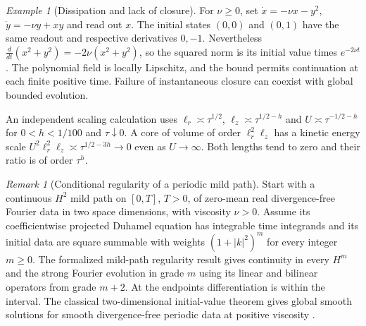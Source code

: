 \documentclass[aps,pra,onecolumn,superscriptaddress,nofootinbib,10pt]{revtex4-2}
\theoremstyle{definition}
\theoremstyle{remark}
\newtheorem{remark}[theorem]{Remark}
\newtheorem{example}[theorem]{Example}
\begin{document}
\begin{example}[Dissipation and lack of closure]
\label{ob:dissipativecounter}
For $\nu\ge0$, set
$\dot x=-\nu x-y^2$, $\dot y=-\nu y+xy$ and read out $x$.
The initial states $(0,0)$ and $(0,1)$ have the same readout and
respective derivatives $0,-1$. Nevertheless
$\tfrac{d}{dt}(x^2+y^2)=-2\nu(x^2+y^2)$, so the squared norm is its
initial value times $e^{-2\nu t}$. The polynomial field is locally
Lipschitz, and the bound permits continuation at each finite positive
time. Failure of instantaneous closure can coexist with global bounded
evolution.

An independent scaling calculation uses
$\ell_r\asymp\tau^{1/2}$, $\ell_z\asymp\tau^{1/2-h}$ and
$U\asymp\tau^{-1/2-h}$ for $0<h<1/100$ and $\tau\downarrow0$.
A core of volume of order $\ell_r^2\ell_z$ has a kinetic energy scale
$U^2\ell_r^2\ell_z\asymp\tau^{1/2-3h}\to0$ even as $U\to\infty$.
Both lengths tend to zero and their ratio is of order $\tau^h$.
\end{example}

\begin{remark}[Conditional regularity of a periodic mild path]
\label{ob:fluidmild}
Start with a continuous $H^2$ mild path on $[0,T]$, $T>0$, of zero-mean
real divergence-free Fourier data in two space dimensions, with viscosity
$\nu>0$. Assume its coefficientwise projected Duhamel equation
has integrable time integrands and its initial data are square summable
with weights $(1+|k|^2)^m$ for every integer $m\ge0$. The formalized
mild-path regularity result \cite{obr:MildPath} gives continuity in every $H^m$ and the strong
Fourier evolution in grade $m$ using its linear and bilinear operators
from grade $m+2$. At the endpoints differentiation is within the interval.
The classical two-dimensional initial-value theorem gives global smooth
solutions for smooth divergence-free periodic data at positive viscosity
\cite{obr:Ladyzhenskaya}.
\end{remark}
\end{document}
